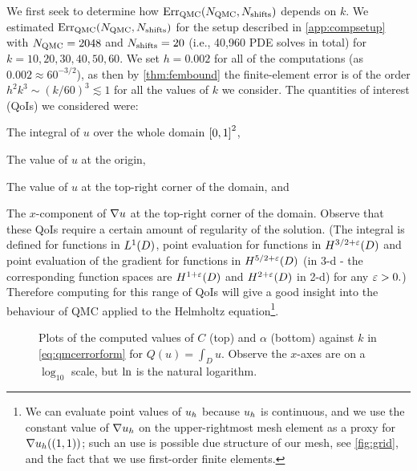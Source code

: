 We first seek to determine how $\QMCerror{\NQMC}{\Nshifts}$ depends on $k.$ We estimated $\QMCerror{\NQMC}{\Nshifts}$ for the setup described in \cref{app:compsetup} with $N_{\mathrm{QMC}} = 2048$ and $N_{\mathrm{shifts}}=20$ (i.e., 40,960 PDE solves in total) for $k = 10,20,30,40,50,60$. We set $h = 0.002$ for all of the computations (as $0.002 \approx 60^{-3/2}$), as then by \cref{thm:fembound} the finite-element error is of the order $h^2k^3 \sim (k/60)^3 \lesssim 1$ for all the values of $k$ we consider. The quantities of interest (QoIs) we considered were:
\bit
\item The integral of $u$ over the whole domain $\mleft[0,1\mright]^2$,
\item The value of $u$ at the origin,
\item The value of $u$ at the top-right corner of the domain, and
\item The $x$-component of $\nabla u$ at the top-right corner of the domain.
  \eit
  Observe that these QoIs require a certain amount of regularity of the solution. (The integral is defined for functions in $\LoD$, point evaluation for functions in $\Hfn{}{3/2 + \eps}{D}$ and point evaluation of the gradient for functions in $\Hfn{}{5/2+\eps}{D}$ (in 3-d - the corresponding function spaces are $\Hfn{}{1+\eps}{D}$ and $\Hfn{}{2+\eps}{D}$ in 2-d) for any $\varepsilon > 0.$) Therefore computing for this range of QoIs will give a good insight into the behaviour of QMC applied to the Helmholtz equation\footnote{We can evaluate point values of $u_{h}$ because $u_{h}$ is continuous, and we use the constant value of $\nabla u_{h}$ on the upper-rightmost mesh element as a proxy for $\nabla u_{h}((1,1))$; such an use is possible due structure of our mesh, see \cref{fig:grid}, and the fact that we use first-order finite elements.}.


\begin{figure}[h]
    \centering
    \begin{subfigure}{\textwidth}
      \centering

    \end{subfigure}
    \begin{subfigure}{\textwidth}
                \centering
      
    \end{subfigure}
\caption{Plots of the computed values of $C$ (top) and $\alpha$ (bottom) against $k$ in \cref{eq:qmcerrorform} for $Q(u) = \int_D u$. Observe the $x$-axes are on a $\log_{10}$ scale, but $\operatorname{ln}$ is the natural logarithm. \label{fig:integralCalpha}}
\end{figure}

